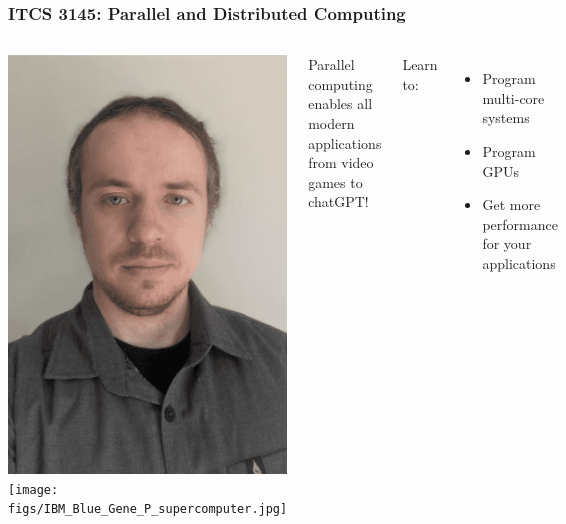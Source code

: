 \documentclass[aspectratio=169]{beamer}
\date{}
\begin{document}
\begin{frame}
  \frametitle{ITCS 3145: Parallel and Distributed Computing}

  \begin{columns}
    \includegraphics[width=\linewidth]{figs/Allen.png}
    \texttt{[image: figs/IBM\_Blue\_Gene\_P\_supercomputer.jpg]}
    
    Parallel computing enables all modern applications from video games to chatGPT!

    Learn to:
    \begin{itemize}
    \item Program multi-core systems
    \item Program GPUs
    \item Get more performance for your applications
    \end{itemize}
  \end{columns}
  
\end{frame}
\end{document}
